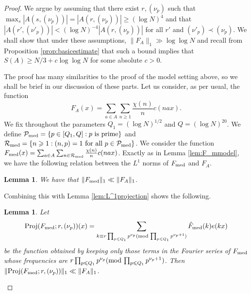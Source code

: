 \documentclass[11pt, reqno]{amsart}
\newtheorem{lemma}[theorem]{Lemma}
\newcommand{\mdlem}[1]{\ensuremath{(\mbox{\textup{mod}}\, #1)}}
\newcommand{\mdsublem}[1]{\ensuremath{(\mbox{\scriptsize \textup{mod}}\, #1)}}
\DeclareMathOperator{\Proj}{Proj}
\begin{document}
\begin{proof}
    We argue by assuming that there exist $r,(\nu_p)$ such that $\max_s|A(s,(\nu_p))|=|A(r,(\nu_p))|\geqslant (\log N)^4$ and that $|A(r',(\nu'_p))|< (\log N)^{-4}|A(r,(\nu_p))|$ for all $r'$ and $(\nu'_p)\prec(\nu_p)$. We shall show that under these assumptions, $\lVert F_A\rVert_1\gg \log\log N$ and recall from Proposition \ref{prop:basicestimate} that such a bound implies that $S(A)\geqslant N/3+c\log\log N$ for some absolute $c>0$.
    
    \medskip
    
    The proof has many similarities to the proof of the model setting above, so we shall be brief in our discussion of these parts. Let us consider, as per usual, the function
    $$F_A(x)=\sum_{a\in A}\sum_{n\geqslant 1}\frac{\chi(n)}{n}c( nax).$$
    We fix throughout the parameters $Q_1=(\log N)^{1/2}$ and $Q=(\log N)^{20}$. We define
    $\mathcal{P}_\textnormal{med}=\{p\in[Q_1,Q]: p\text{ is prime}\}$ and $\mathcal{R}_\textnormal{med}=\{n\geqslant 1:(n,p)=1\text{ for all }p\in\mathcal{P}_\textnormal{med}\}$.
    We consider the function $F_\textnormal{med}(x)=\sum_{a\in A}\sum_{n \in \mathcal{R}_\textnormal{med}}\frac{\chi(n)}{n}c( nax)$. Exactly as in Lemma \ref{lem:F_mmodel}, we have the following relation between the $L^1$ norms of $F_\textnormal{med}$ and $F_A$.
    \begin{lemma}\label{lem:F_m}
        We have that $\lVert F_\textnormal{med}\rVert_1\ll \lVert F_A\rVert_1$.
        
    \end{lemma}
    Combining this with Lemma \ref{lem:L^1projection} shows the following.
    \begin{lemma}\label{lem:L^1proj}
    Let $$\Proj(F_\textnormal{med};r,(\nu_p))(x)=\sum_{k\equiv r\prod_{p\leqslant Q_1} p^{\nu_p}\mdsublem{\prod_{p\leqslant Q_1} p^{\nu_p+1}}}\hat{F}_\textnormal{med}(k)e(kx)$$
    be the function obtained by keeping only those terms in the Fourier series of $F_\textnormal{med}$ whose frequencies are $r\prod_{p\leqslant Q_1} p^{\nu_p}\mdlem {\prod_{p\leqslant Q_1} p^{\nu_p+1}}$. Then $\lVert \Proj(F_\textnormal{med};r,(\nu_p))\rVert_1\ll \lVert F_A\rVert_1$.
        

\end{lemma}
\end{proof}
\end{document}
